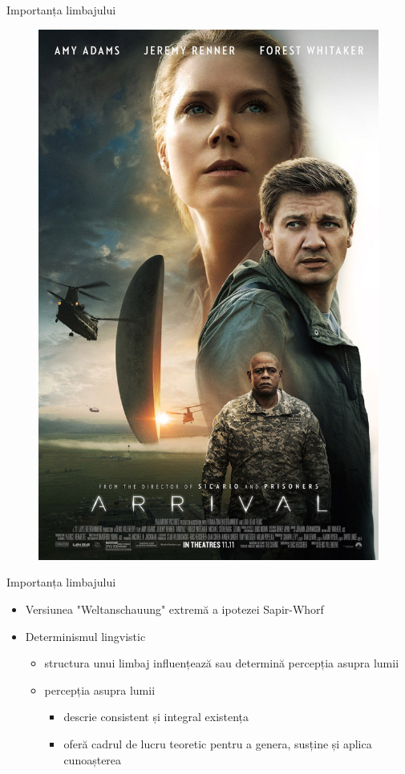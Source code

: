 \documentclass[pdf]{beamer}
\begin{document}
\begin{frame}{Importanța limbajului}
\begin{figure}[ht!]
\centering
\includegraphics[scale=0.18]{img/arrivalposter.jpg}
\end{figure}
\end{frame}



\begin{frame}{Importanța limbajului}
\begin{itemize}
\item
Versiunea "Weltanschauung" extremă a ipotezei Sapir-Whorf
\item
Determinismul lingvistic
\begin{itemize}
\item
structura unui limbaj influențează sau determină percepția asupra lumii
\item
percepția asupra lumii
\begin{itemize}
\item
descrie consistent și integral existența
\item
oferă cadrul de lucru teoretic pentru a genera, susține și aplica cunoașterea
\end{itemize}
\end{itemize}
\end{itemize}
\end{frame}
\end{document}
